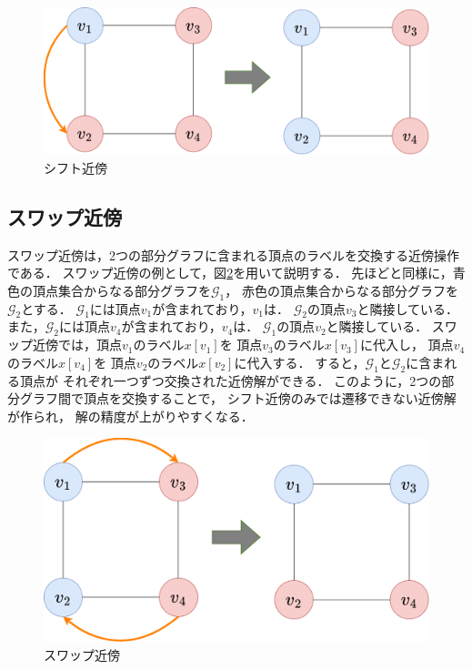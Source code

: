 \begin{figure}[htbp]
  \centering
  \includegraphics[scale=0.2]{img/shift-neighbor.png}
  \caption{シフト近傍}
  \label{shift-neighbor}
\end{figure}

\subsection{スワップ近傍}

スワップ近傍は，2つの部分グラフに含まれる頂点のラベルを交換する近傍操作である．
スワップ近傍の例として，図\ref{swap-neighbor}を用いて説明する．
先ほどと同様に，青色の頂点集合からなる部分グラフを$\mathcal{G}_1$，
赤色の頂点集合からなる部分グラフを$\mathcal{G}_2$とする．
$\mathcal{G}_1$には頂点$v_1$が含まれており，$v_1$は．
$\mathcal{G}_2$の頂点$v_3$と隣接している．
また，$\mathcal{G}_2$には頂点$v_4$が含まれており，$v_4$は．
$\mathcal{G}_1$の頂点$v_2$と隣接している．
スワップ近傍では，頂点$v_1$のラベル$x[v_1]$を
頂点$v_3$のラベル$x[v_3]$に代入し，
頂点$v_4$のラベル$x[v_4]$を
頂点$v_2$のラベル$x[v_2]$に代入する．
すると，$\mathcal{G}_1$と$\mathcal{G}_2$に含まれる頂点が
それぞれ一つずつ交換された近傍解ができる．
このように，2つの部分グラフ間で頂点を交換することで，
シフト近傍のみでは遷移できない近傍解が作られ，
解の精度が上がりやすくなる．

\begin{figure}[htbp]
  \centering
  \includegraphics[scale=0.2]{img/swap-neighbor.png}
  \caption{スワップ近傍}
  \label{swap-neighbor}
\end{figure}

